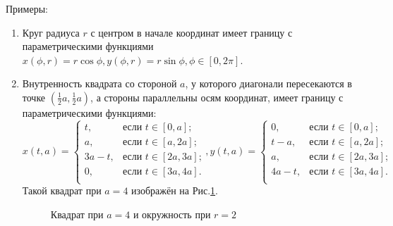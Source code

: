 \documentclass[a4paper, 12pt]{article}
\begin{document}
Примеры:
\begin{enumerate}
    \item Круг радиуса $r$ с центром в начале координат имеет границу с параметрическими функциями $x(\phi, r)=r \cos \phi, y(\phi, r)=r \sin \phi, \phi \in [0, 2\pi]$. 
     \item Внутренность квадрата со стороной $a$, у которого диагонали пересекаются в точке $(\frac{1}{2}a,\frac{1}{2}a)$, а стороны параллельны осям координат, имеет границу с параметрическими функциями:
     \[
x(t,a) =
\begin{cases}
t, & \text{если $t \in [0,a]$;} \\
a, & \text{если $t \in [a,2a]$;} \\
3a-t, & \text{если $t \in [2a,3a]$;} \\
0, & \text{если $t \in [3a,4a]$.} \\
\end{cases},
y(t,a) =
\begin{cases}
0, & \text{если $t \in [0,a]$;} \\
t-a, & \text{если $t \in [a,2a]$;} \\
a, & \text{если $t \in [2a,3a]$;} \\
4a-t, & \text{если $t \in [3a,4a]$.} \\
\end{cases}
\]
Такой квадрат при $a=4$ изображён на Рис.\ref{kvci}.
\begin{figure}[h!]
    \noindent{}
    \caption{Квадрат при $a=4$ и окружность при $r=2$}
    \label{kvci}
    \end{figure} 


\end{enumerate}
\end{document}
